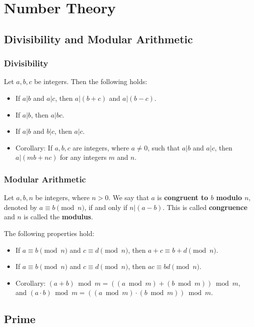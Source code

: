\documentclass[a4paper,12pt]{article}
\begin{document}
\section{Number Theory}

\subsection{Divisibility and Modular Arithmetic}

\subsubsection{Divisibility}

Let $a,b,c$ be integers. 
Then the following holds:
\begin{itemize}
	\item If $a|b$ and $a|c$, then $a|(b+c)$ and $a|(b-c)$.
	\item If $a|b$, then $a|bc$.
	\item If $a|b$ and $b|c$, then $a|c$.
	\item Corollary: If $a,b,c$ are integers, where $a \neq 0$, such that $a|b$ and $a|c$, then $a|(m b + n c)$ for any integers $m$ and $n$.
\end{itemize}

\subsubsection{Modular Arithmetic}

Let $a,b,n$ be integers, where $n > 0$.
We say that $a$ is \textbf{congruent to $b$ modulo $n$}, denoted by $a \equiv b \pmod{n}$, if and only if $n|(a-b)$.
This is called \textbf{congruence} and $n$ is called the \textbf{modulus}.

The following properties hold:
\begin{itemize}
	\item If $a \equiv b \pmod{n}$ and $c \equiv d \pmod{n}$, then $a+c \equiv b+d \pmod{n}$.
	\item If $a \equiv b \pmod{n}$ and $c \equiv d \pmod{n}$, then $ac \equiv bd \pmod{n}$.
	\item Corollary: $(a+b) \bmod m = ((a \bmod m) + (b \bmod m)) \bmod m$, and $(a \cdot b) \bmod m = ((a \bmod m) \cdot (b \bmod m)) \bmod m$.
\end{itemize}

\subsection{Prime}
\end{document}
